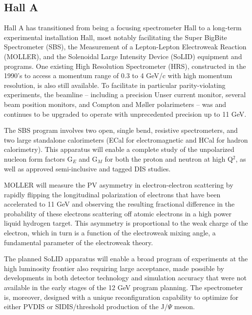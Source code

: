 \subsection{Hall A}
\label{sec:app-halla}
Hall A has transitioned from being a focusing spectrometer Hall to a long-term experimental installation Hall, most notably facilitating the Super BigBite Spectrometer (SBS), the Measurement of a Lepton-Lepton Electroweak Reaction (MOLLER), and the Solenoidal Large Intensity Device (SoLID) equipment and programs. One existing High Resolution Spectrometer (HRS), constructed in the 1990's to access
a momentum range of 0.3 to 4 GeV/c with high momentum resolution, is also still available. To facilitate in particular parity-violating experiments, the beamline -- including a precision Unser current monitor, several beam position monitors, and Compton and Møller polarimeters -- was and continues to be upgraded to operate with unprecedented precision up to 11 GeV.

The SBS program involves two open, single bend, resistive spectrometers, and two large standalone calorimeters (ECal for electromagnetic and HCal for hadron calorimetry). This apparatus will enable a complete study of the unpolarized nucleon form factors G$_E$ and G$_M$ for both the proton and neutron at high Q$^2$, as well as approved semi-inclusive and tagged DIS studies. 

MOLLER will measure the PV asymmetry in electron-electron scattering by rapidly flipping the longitudinal polarization of electrons that have been accelerated to 11 GeV and observing the resulting fractional difference in the probability of these electrons scattering off atomic electrons in a high power liquid hydrogen target. This asymmetry is proportional to the weak charge of the electron, which in turn is a function of the electroweak mixing angle, a fundamental parameter of the electroweak theory. 

The planned SoLID apparatus will enable a broad program of experiments at the high luminosity frontier also requiring large acceptance, made possible by developments in both detector technology and simulation accuracy that were not available in the early stages of the 12 GeV program planning. The spectrometer is, moreover, designed with a unique reconfiguration capability to optimize for either PVDIS or SIDIS/threshold production of the J/$\Psi$ meson.